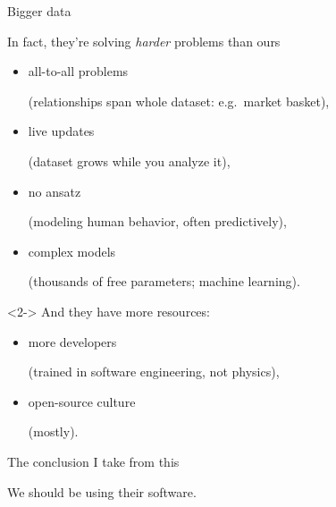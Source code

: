 \documentclass[aspectratio=169]{beamer}
\begin{document}
\begin{frame}{Bigger data}
\vspace{0.5 cm}

\large In fact, they're solving {\it harder} problems than ours

\vspace{0.1 cm}
\begin{itemize}
\item all-to-all problems \hfill \begin{minipage}{0.7\linewidth}(relationships span whole dataset: e.g.\ market basket),\end{minipage}
\item live updates \hfill \begin{minipage}{0.7\linewidth}(dataset grows while you analyze it),\end{minipage}
\item no ansatz \hfill \begin{minipage}{0.7\linewidth}(modeling human behavior, often predictively),\end{minipage}
\item complex models \hfill \begin{minipage}{0.7\linewidth}(thousands of free parameters; machine learning).\end{minipage}
\end{itemize}

\vspace{0.5 cm}
\begin{uncoverenv}<2->
\large And they have more resources:

\vspace{0.1 cm}
\begin{itemize}
\item more developers \hfill \begin{minipage}{0.7\linewidth}(trained in software engineering, not physics),\end{minipage}
\item open-source culture \hfill \begin{minipage}{0.7\linewidth}(mostly).\end{minipage}
\end{itemize}
\end{uncoverenv}
\end{frame}

\begin{frame}{The conclusion I take from this}
\vspace{0.5 cm}
\begin{center}
\LARGE We should be using their software.
\end{center}
\end{frame}
\end{document}
